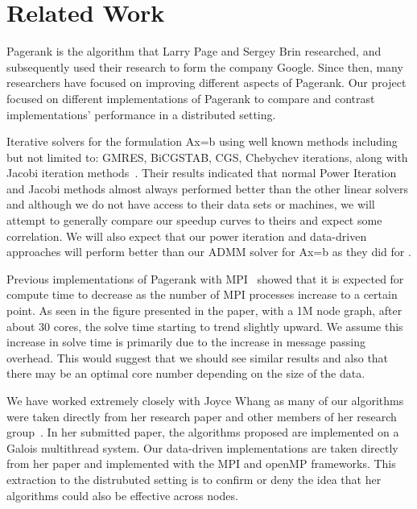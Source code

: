 \documentclass[letterpaper,12pt,onecolumn]{article}
\begin{document}
\section{Related Work}

Pagerank is the algorithm that Larry Page and Sergey Brin researched, and subsequently used their research to form the company Google. Since then, many researchers have focused on improving different aspects of Pagerank. Our project focused on different implementations of Pagerank to compare and contrast implementations' performance in a distributed setting. 

Iterative solvers for the formulation Ax=b using well known methods including but not limited to: GMRES, BiCGSTAB, CGS, Chebychev iterations, along with Jacobi iteration methods~\cite{FastParallel}. Their results indicated that normal Power Iteration and Jacobi methods almost always performed better than the other linear solvers and although we do not have access to their data sets or machines, we will attempt to generally compare our speedup curves to theirs and expect some correlation. We will also expect that our power iteration and data-driven approaches will perform better than our ADMM solver for Ax=b as they did for \cite{FastParallel}.
 
Previous implementations of Pagerank with MPI~\cite{MPIPR} showed that it is expected for compute time to decrease as the number of MPI processes increase to a certain point. As seen in the figure presented in the paper, with a 1M node graph, after about 30 cores, the solve time starting to trend slightly upward. We assume this increase in solve time is primarily due to the increase in message passing overhead. This would suggest that we should see similar results and also that there may be an optimal core number depending on the size of the data. 

We have worked extremely closely with Joyce Whang as many of our algorithms were taken directly from her research paper and other members of her research group~\cite{Joyce}. In her submitted paper, the algorithms proposed are implemented on a Galois multithread system. Our data-driven implementations are taken directly from her paper and implemented with the MPI and openMP frameworks. This extraction to the distrubuted setting is to confirm or deny the idea that her algorithms could also be effective across nodes.
\end{document}
